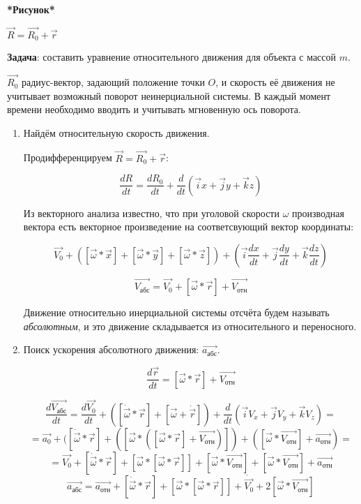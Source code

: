 \documentclass[a4paper,oneside]{article}
\theoremstyle{definition}
\theoremstyle{definition}
\theoremstyle{definition}
\newcommand{\tbf}[1]{\textbf{#1}}
\begin{document}
\tbf{*Рисунок*}

$\vec{R} = \vec{R_0} + \vec{r}$

\tbf{Задача}: составить уравнение относительного движения для объекта с массой $m$.

$\vec{R_0}$ радиус-вектор, задающий положение точки $O$, и скорость её движения не учитывает возможный 
поворот неинерциальной системы. В каждый момент времени необходимо вводить и учитывать мгновенную ось поворота.
\begin{enumerate} 
    \item Найдём относительную скорость движения.

Продифференцируем $\vec{R} = \vec{R_0} + \vec{r}$:

\[\frac{dR}{dt} = \frac{dR_0}{dt} + \frac{d}{dt} (\vec{i}x + \vec{j}y + \vec{k}z)\]

Из векторного анализа известно, что при уголовой скорости $\omega$ производная вектора есть векторное произведение
на соответсвующий вектор координаты:

\[\vec{V_0} +([ \vec{\omega} * \vec{x} ] + [ \vec{\omega} * \vec{y} ] + [ \vec{\omega} * \vec{z} ])
 + (\vec{i} \frac {dx}{dt} + \vec{j} \frac {dy}{dt} + \vec{k} \frac {dz}{dt})\]

 \[\vec{V_\text{абс}} = \vec{V_0} + [\vec{\omega} * \vec{r}] + \vec{V_\text{отн}}\]

 Движение относительно инерциальной системы отсчёта будем называть \textit{абсолютным}, и это движение складывается
 из относительного и переносного.

 
    \item Поиск ускорения абсолютного движения: $\vec{a_{\text{абс}}}$.

 \[\frac{d \vec{r}}{dt} = [\vec{\omega} * \vec{r}] + \vec{V_{\text{отн}}}\]

 \[ \frac{d \vec{V_\text{абс}}}{dt} = \frac{d \vec{V_0}}{dt} + 
 ([\dot{\vec{\omega}} * \vec{r}] + [\vec{\omega} + \dot{\vec{r}}]) + \frac{d}{dt} (\vec{i} V_x + \vec{j} V_y + \vec{k} V_z) = \] 
\[= \vec{a_0} + ([\dot{\vec{\omega}} * \vec{r}] + ([\vec{\omega} * ([\vec{\omega} * \vec{r}] + \vec{V_\text{отн}})]) + 
([\vec{\omega} * \vec{V_\text{отн}}] + \vec{a_\text{отн}}) = \] 
\[ = \vec{V_0} + [\dot{\vec{\omega}} * \vec{r}] + [\vec{\omega} * [\vec{\omega} * \vec{r}]] + [\vec{\omega} * \vec{V_\text{отн}}] +
[\vec{\omega} * \vec{V_\text{отн}}] + \vec{a_\text{отн}} \]
\[ \vec{a_\text{абс}} = \vec{a_\text{отн}} + [\dot{\vec{\omega}} * \vec{r}] + [\vec{\omega} * [\vec{\omega} * \vec{r}]] +
\dot{\vec{V_0}} + 2[\vec{\omega} * \vec{V_\text{отн}}] \]
\end{enumerate}
\end{document}
